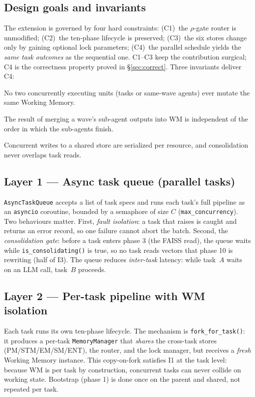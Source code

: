 \documentclass[10pt,twocolumn]{article}
\newcommand{\code}[1]{\texttt{\small #1}}
\begin{document}
\subsection{Design goals and invariants}
The extension is governed by four hard constraints: (C1)~the $\rho$-gate router is
unmodified; (C2)~the ten-phase lifecycle is preserved; (C3)~the six stores change
only by gaining optional lock parameters; (C4)~the parallel schedule yields the
\emph{same task outcomes} as the sequential one. C1--C3 keep the contribution
surgical; C4 is the correctness property proved in \S\ref{sec:correct}. Three
invariants deliver C4:
\begin{description}\itemsep1pt
\item[\textsc{I1 (WM isolation).}] No two concurrently executing units (tasks or
same-wave agents) ever mutate the same Working Memory.
\item[\textsc{I2 (deterministic merge).}] The result of merging a wave's
sub-agent outputs into WM is independent of the order in which the sub-agents
finish.
\item[\textsc{I3 (no lost writes).}] Concurrent writes to a shared store are
serialized per resource, and consolidation never overlaps task reads.
\end{description}

\subsection{Layer 1 --- Async task queue (parallel tasks)}
\code{AsyncTaskQueue} accepts a list of task specs and runs each task's full
pipeline as an \code{asyncio} coroutine, bounded by a semaphore of size $C$
(\code{max\_concurrency}). Two behaviours matter. First, \emph{fault isolation}: a
task that raises is caught and returns an error record, so one failure cannot
abort the batch. Second, the \emph{consolidation gate}: before a task enters phase
3 (the FAISS read), the queue waits while \code{is\_consolidating()} is true, so no
task reads vectors that phase 10 is rewriting (half of \textsc{I3}). The queue
reduces \emph{inter-task} latency: while task~$A$ waits on an LLM call, task~$B$
proceeds.

\subsection{Layer 2 --- Per-task pipeline with WM isolation}
Each task runs its own ten-phase lifecycle. The mechanism is
\code{fork\_for\_task()}: it produces a per-task \code{MemoryManager} that
\emph{shares} the cross-task stores (PM/STM/EM/SM/ENT), the router, and the lock
manager, but receives a \emph{fresh} Working Memory instance. This copy-on-fork
satisfies \textsc{I1} at the task level: because WM is per task by construction,
concurrent tasks can never collide on working state. Bootstrap (phase 1) is done
once on the parent and shared, not repeated per task.
\end{document}
